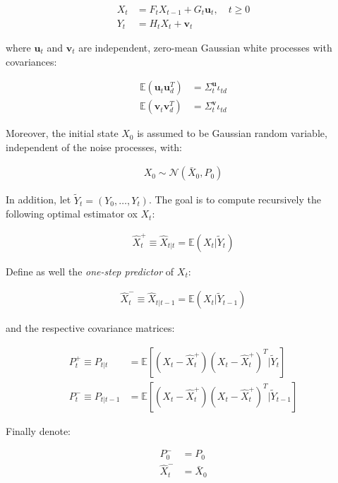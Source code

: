 \documentclass{pracamgr}
\numberwithin{equation}{section}
\begin{document}
\begin{align}
X_{t} &= F_{t} X_{t-1} + G_{t} \mathbf{u}_{t}, \quad t \geqslant 0 \\
Y_{t} &= H_{t} X_{t} + \mathbf{v}_{t}
\end{align}

where $\mathbf{u}_{t}$ and $\mathbf{v}_{t}$ are independent, zero-mean Gaussian white processes with covariances:

\begin{align}
\mathbb{E} \left(\mathbf{u}_{t} \mathbf{u}_{d}^{T} \right) &= \Sigma_{t}^{\mathbf{u}} \iota _{td} \\
\mathbb{E} \left(\mathbf{v}_{t} \mathbf{v}_{d}^{T} \right) &= \Sigma_{t}^{\mathbf{v}} \iota _{td}
\end{align}


Moreover, the initial state $X_{0}$ is assumed to be Gaussian random variable, independent of the noise processes, with:

\begin{align}
X_{0} \sim \mathcal{N} \left(\bar{X}_{0}, P_{0} \right)
\end{align}

In addition, let $\tilde{Y}_{t} = (Y_{0}, \ldots, Y_{t})$. The goal is to compute recursively the following optimal estimator ox $X_{t}$:

\begin{align}
\hat{X}_{t}^{+} \equiv \hat{X}_{t | t} = \mathbb{E} (X_{t} | \tilde{Y}_{t})
\end{align}

Define as well the \textit{one-step predictor} of $X_{t}$:

\begin{align}
\hat{X}_{t}^{-} \equiv \hat{X}_{t | t-1} = \mathbb{E} (X_{t} | \tilde{Y}_{t-1})
\end{align}

and the respective covariance matrices:

\begin{align}
P_{t}^{+} \equiv P_{t | t} &= \mathbb{E} \left[ \left(X_{t} -\hat{X}_{t}^{+} \right) \left(X_{t} - \hat{X}_{t}^{+} \right)^{T} |  \tilde{Y}_{t}\right] \\
P_{t}^{-} \equiv P_{t | t-1} &= \mathbb{E} \left[ \left(X_{t} -\hat{X}_{t}^{+} \right) \left(X_{t} - \hat{X}_{t}^{+} \right)^{T} |  \tilde{Y}_{t-1} \right]
\end{align}

Finally denote:

\begin{align}
P_{0}^{-} &= P_{0} \\
\hat{X}_{t}^{-} &= \bar{X}_{0}
\end{align}
\end{document}
